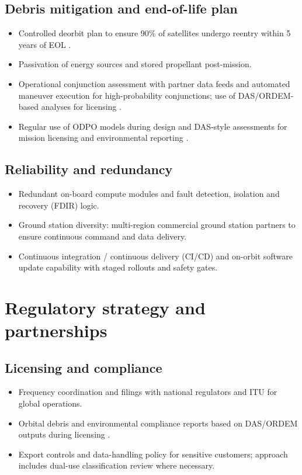 \subsection{Debris mitigation and end-of-life plan}
\begin{itemize}
  \item Controlled deorbit plan to ensure 90\% of satellites undergo reentry within 5 years of EOL \parencite{odpo}.
  \item Passivation of energy sources and stored propellant post-mission.
  \item Operational conjunction assessment with partner data feeds and automated maneuver execution for high-probability conjunctions; use of DAS/ORDEM-based analyses for licensing \parencite{das,odpo}.
  \item Regular use of ODPO models during design and DAS-style assessments for mission licensing and environmental reporting \parencite{odpo,das}.
\end{itemize}

\subsection{Reliability and redundancy}
\begin{itemize}
  \item Redundant on-board compute modules and fault detection, isolation and recovery (FDIR) logic.
  \item Ground station diversity: multi-region commercial ground station partners to ensure continuous command and data delivery.
  \item Continuous integration / continuous delivery (CI/CD) and on-orbit software update capability with staged rollouts and safety gates.
\end{itemize}

\section{Regulatory strategy and partnerships}
\subsection{Licensing and compliance}
\begin{itemize}
  \item Frequency coordination and filings with national regulators and ITU for global operations.
  \item Orbital debris and environmental compliance reports based on DAS/ORDEM outputs during licensing \parencite{das,odpo}.
  \item Export controls and data-handling policy for sensitive customers; approach includes dual-use classification review where necessary.
\end{itemize}

